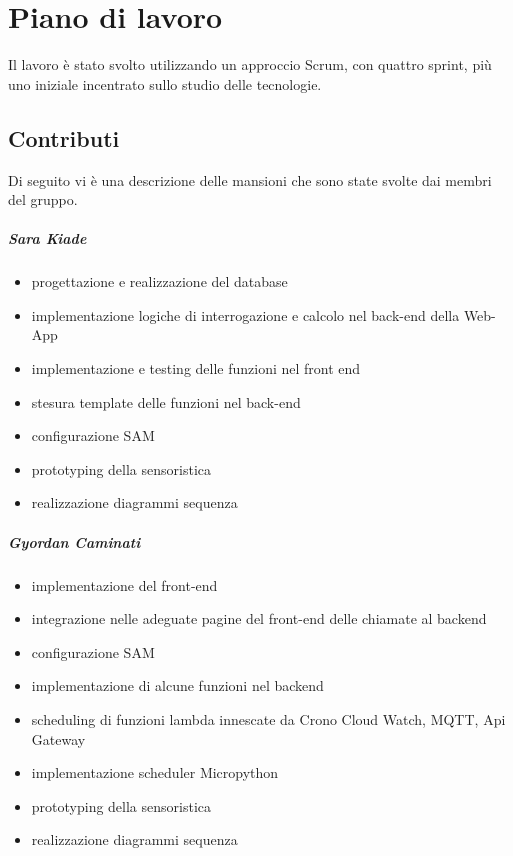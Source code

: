 

\chapter{Piano di lavoro}
Il lavoro è stato svolto utilizzando un approccio Scrum, con quattro sprint, più uno iniziale incentrato sullo studio delle tecnologie.
\section{Contributi}
Di seguito vi è una descrizione delle mansioni che sono state svolte dai membri del gruppo.
\paragraph{Sara Kiade} 
\begin{itemize}
    \item progettazione e realizzazione del database
    \item implementazione logiche di interrogazione e calcolo nel back-end della Web-App
    \item implementazione e testing delle funzioni nel front end 
    \item stesura template delle funzioni nel back-end
    \item configurazione SAM
    \item prototyping della sensoristica
    \item realizzazione diagrammi sequenza
\end{itemize}

\paragraph{Gyordan Caminati}
\begin{itemize}
    \item implementazione del front-end
    \item integrazione nelle adeguate pagine del front-end delle chiamate al backend 
    \item configurazione SAM
    \item implementazione di alcune funzioni nel backend
    \item scheduling di funzioni lambda innescate da Crono Cloud Watch, MQTT, Api Gateway
    \item implementazione scheduler Micropython
    \item prototyping della sensoristica
    \item realizzazione diagrammi sequenza
\end{itemize}

